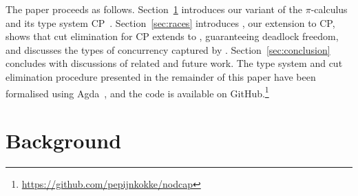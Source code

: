 \documentclass[a4paper,UKenglish]{lipics-v2016}
\begin{document}

The paper proceeds as follows.  Section~\ref{sec:background} introduces our
variant of the $\pi$-calculus and its type system CP~\cite{wadler2012}.
Section~\ref{sec:races} introduces \nodcap, our extension to CP, shows that cut
elimination for CP extends to \nodcap, guaranteeing deadlock freedom, and
discusses the types of concurrency captured by \nodcap.
Section~\ref{sec:conclusion} concludes with discussions of related and future work.
%
The type system and cut elimination procedure presented in the remainder of this
paper have been formalised using Agda~\cite{norell2009}, and the code is
available on GitHub.\footnote{%
  \url{https://github.com/pepijnkokke/nodcap}
}

\section{Background}
\label{sec:background}
\end{document}
